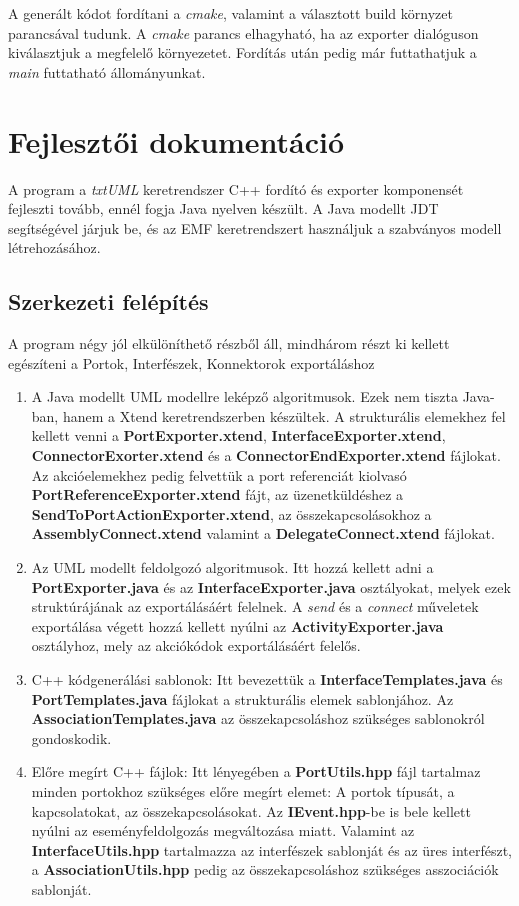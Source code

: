 \documentclass[a4paper,12pt]{report}
\begin{document}
A generált kódot fordítani a \textit{cmake}, valamint a választott build környzet parancsával tudunk. A \textit{cmake} parancs elhagyható, ha az exporter dialóguson kiválasztjuk a megfelelő környezetet. Fordítás után pedig már futtathatjuk a \textit{main} futtatható állományunkat.

\section{Fejlesztői dokumentáció}
A program a \textit{txtUML} keretrendszer C++ fordító és exporter komponensét fejleszti tovább, ennél fogja Java nyelven készült. A Java modellt JDT segítségével járjuk be, és az EMF keretrendszert használjuk a szabványos modell létrehozásához. \\

\subsection{Szerkezeti felépítés}
A program négy jól elkülöníthető részből áll, mindhárom részt ki kellett egészíteni a Portok, Interfészek, Konnektorok exportáláshoz

\begin{enumerate}
\item A Java modellt UML modellre leképző algoritmusok. Ezek nem tiszta Java-ban, hanem a Xtend keretrendszerben készültek. A strukturális elemekhez fel kellett venni a \textbf{PortExporter.xtend}, \textbf{InterfaceExporter.xtend}, \textbf{ConnectorExorter.xtend} és a \textbf{ConnectorEndExporter.xtend} fájlokat. Az akcióelemekhez pedig felvettük a port referenciát kiolvasó \textbf{PortReferenceExporter.xtend} fájt, az üzenetküldéshez a \textbf{SendToPortActionExporter.xtend}, az összekapcsolásokhoz a \textbf{AssemblyConnect.xtend} valamint a \textbf{DelegateConnect.xtend} fájlokat.
\item Az UML modellt feldolgozó algoritmusok. Itt hozzá kellett adni a  \textbf{PortExporter.java} és az \textbf{InterfaceExporter.java} osztályokat, melyek ezek struktúrájának az exportálásáért felelnek. A \textit{send} és a \textit{connect} műveletek exportálása végett hozzá kellett nyúlni az \textbf{ActivityExporter.java} osztályhoz, mely az akciókódok exportálásáért felelős.
\item C++ kódgenerálási sablonok: Itt bevezettük a \textbf{InterfaceTemplates.java} és \textbf{PortTemplates.java} fájlokat a strukturális elemek sablonjához. Az \textbf{AssociationTemplates.java} az összekapcsoláshoz szükséges sablonokról gondoskodik.
\item Előre megírt C++ fájlok: Itt lényegében a \textbf{PortUtils.hpp} fájl tartalmaz minden portokhoz szükséges előre megírt elemet: A portok típusát, a kapcsolatokat, az összekapcsolásokat. Az \textbf{IEvent.hpp}-be is bele kellett nyúlni az eseményfeldolgozás megváltozása miatt. Valamint az \textbf{InterfaceUtils.hpp} tartalmazza az interfészek sablonját és az üres interfészt, a \textbf{AssociationUtils.hpp} pedig az összekapcsoláshoz szükséges asszociációk sablonját.
\end{enumerate}
\end{document}

